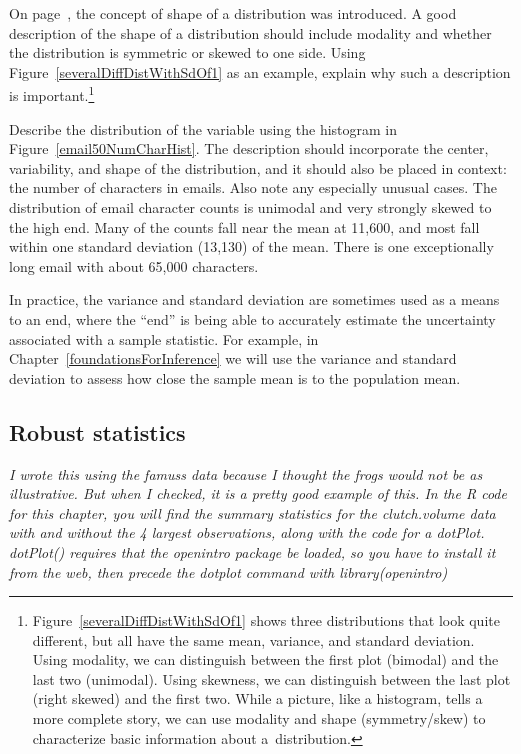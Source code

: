 \begin{doublespace}
\begin{exercise}
	On page~\pageref{shapeFirstDiscussed}, the concept of shape of a distribution was introduced. A good description of the shape of a distribution should include modality and whether the distribution is symmetric or skewed to one side. Using Figure~\ref{severalDiffDistWithSdOf1} as an example, explain why such a description is important.\footnote{Figure~\ref{severalDiffDistWithSdOf1} shows three distributions that look quite different, but all have the same mean, variance, and standard deviation. Using modality, we can distinguish between the first plot (bimodal) and the last two (unimodal). Using skewness, we can distinguish between the last plot (right skewed) and the first two. While a picture, like a histogram, tells a more complete story, we can use modality and shape (symmetry/skew) to characterize basic information about a~distribution.}
\end{exercise}

\begin{example}{Describe the distribution of the  variable using the histogram in Figure~\vref{email50NumCharHist}. The description should incorporate the center, variability, and shape of the distribution, and it should also be placed in context: the number of characters in emails. Also note any especially unusual cases.}
	The distribution of email character counts is unimodal and very strongly skewed to the high end. Many of the counts fall near the mean at 11,600, and most fall within one standard deviation (13,130) of the mean. There is one exceptionally long email with about 65,000 characters.
\end{example}

In practice, the variance and standard deviation are sometimes used as a means to an end, where the ``end'' is being able to accurately estimate the uncertainty associated with a sample statistic. For example, in Chapter~\ref{foundationsForInference} we will use the variance and standard deviation to assess how close the sample mean is to the population mean.

\subsection{Robust statistics}

\textit{I wrote this using the famuss data because I thought the frogs would not be as illustrative. But when I checked, it is a pretty good example of this.  In the R code for this chapter, you will find the summary statistics for the clutch.volume data with and without the 4 largest observations, along with the code for a dotPlot.  dotPlot() requires that the openintro package be loaded, so  you have to install it from the web, then precede the dotplot command with library(openintro)}


\end{doublespace}
